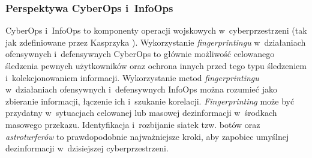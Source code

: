 \subsubsection{Perspektywa CyberOps i~InfoOps}
CyberOps i~InfoOps to komponenty operacji wojskowych w~cyberprzestrzeni (tak jak
zdefiniowane przez Kasprzyka \cite{kasprzyk2020mathematical}). Wykorzystanie
\emph{fingerprintingu} w~działaniach ofensywnych i~defensywnych CyberOps to
głównie możliwość celowanego śledzenia pewnych użytkowników oraz ochrona innych
przed tego typu śledzeniem i~kolekcjonowaniem informacji. Wykorzystanie metod
\emph{fingerprintingu} w~działaniach ofensywnych i~defensywnych InfoOps można
rozumieć jako zbieranie informacji, łączenie ich i~szukanie korelacji.
\emph{Fingerprinting} może być przydatny w~sytuacjach celowanej lub masowej
dezinformacji w~środkach masowego przekazu. Identyfikacja i~rozbijanie siatek
tzw. botów oraz \emph{astroturferów} to prawdopodobnie najważniejsze kroki, aby
zapobiec umyślnej dezinformacji w~dzisiejszej cyberprzestrzeni.
